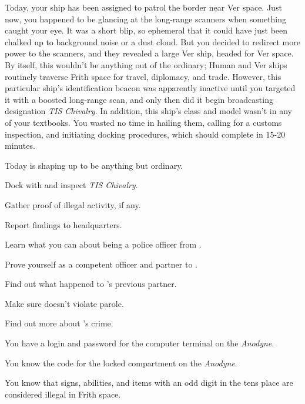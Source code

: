 \documentclass[char]{guildcamp4}
\begin{document}
Today, your ship has been assigned to patrol the border near Ver space. Just now, you happened to be glancing at the long-range scanners when something caught your eye. It was a short blip, so ephemeral that it could have just been chalked up to background noise or a dust cloud. But you decided to redirect more power to the scanners, and they revealed a large Ver ship, headed for Ver space. By itself, this wouldn't be anything out of the ordinary; Human and Ver ships routinely traverse Frith space for travel, diplomacy, and trade. However, this particular ship's identification beacon was apparently inactive until you targeted it with a boosted long-range scan, and only then did it begin broadcasting designation \emph{TIS Chivalry}. In addition, this ship's class and model wasn't in any of your textbooks. You wasted no time in hailing them, calling for a customs inspection, and initiating docking procedures, which should complete in 15-20 minutes.

Today is shaping up to be anything but ordinary.

\begin{itemz}[Goals]
	\item Dock with and inspect \textit{TIS Chivalry}.
	\item Gather proof of illegal activity, if any.
	\item Report findings to headquarters.
	\item Learn what you can about being a police officer from \cCbad{}.
	\item Prove yourself as a competent officer and partner to \cCbad{}.
	\item Find out what happened to \cCbad{}'s previous partner.
	\item Make sure \cPilot{} doesn't violate \cPilot{\their} parole. 
	\item Find out more about \cPilot{}'s crime.
\end{itemz}

\begin{itemz}[Notes]
	\item You have a login and password for the computer terminal on the \emph{Anodyne}.
	\item You know the code for the locked compartment on the \emph{Anodyne}.
	\item You know that signs, abilities, and items with an odd digit in the tens place are considered illegal in Frith space.
\end{itemz}

\begin{contacts}
	\contact{\cTest{}}
\end{contacts}
\end{document}
